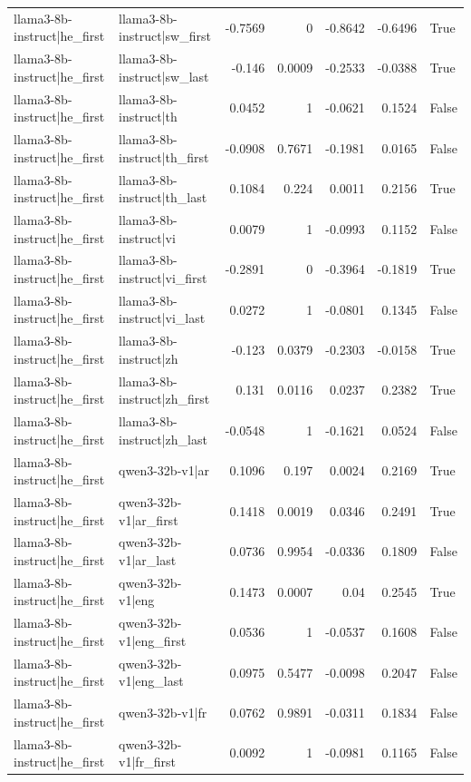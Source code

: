 \begin{table}
\begin{tabular}{l l r r r r l}
llama3-8b-instruct|he_first & llama3-8b-instruct|sw_first & -0.7569 & 0 & -0.8642 & -0.6496 & True \\
llama3-8b-instruct|he_first & llama3-8b-instruct|sw_last & -0.146 & 0.0009 & -0.2533 & -0.0388 & True \\
llama3-8b-instruct|he_first & llama3-8b-instruct|th & 0.0452 & 1 & -0.0621 & 0.1524 & False \\
llama3-8b-instruct|he_first & llama3-8b-instruct|th_first & -0.0908 & 0.7671 & -0.1981 & 0.0165 & False \\
llama3-8b-instruct|he_first & llama3-8b-instruct|th_last & 0.1084 & 0.224 & 0.0011 & 0.2156 & True \\
llama3-8b-instruct|he_first & llama3-8b-instruct|vi & 0.0079 & 1 & -0.0993 & 0.1152 & False \\
llama3-8b-instruct|he_first & llama3-8b-instruct|vi_first & -0.2891 & 0 & -0.3964 & -0.1819 & True \\
llama3-8b-instruct|he_first & llama3-8b-instruct|vi_last & 0.0272 & 1 & -0.0801 & 0.1345 & False \\
llama3-8b-instruct|he_first & llama3-8b-instruct|zh & -0.123 & 0.0379 & -0.2303 & -0.0158 & True \\
llama3-8b-instruct|he_first & llama3-8b-instruct|zh_first & 0.131 & 0.0116 & 0.0237 & 0.2382 & True \\
llama3-8b-instruct|he_first & llama3-8b-instruct|zh_last & -0.0548 & 1 & -0.1621 & 0.0524 & False \\
llama3-8b-instruct|he_first & qwen3-32b-v1|ar & 0.1096 & 0.197 & 0.0024 & 0.2169 & True \\
llama3-8b-instruct|he_first & qwen3-32b-v1|ar_first & 0.1418 & 0.0019 & 0.0346 & 0.2491 & True \\
llama3-8b-instruct|he_first & qwen3-32b-v1|ar_last & 0.0736 & 0.9954 & -0.0336 & 0.1809 & False \\
llama3-8b-instruct|he_first & qwen3-32b-v1|eng & 0.1473 & 0.0007 & 0.04 & 0.2545 & True \\
llama3-8b-instruct|he_first & qwen3-32b-v1|eng_first & 0.0536 & 1 & -0.0537 & 0.1608 & False \\
llama3-8b-instruct|he_first & qwen3-32b-v1|eng_last & 0.0975 & 0.5477 & -0.0098 & 0.2047 & False \\
llama3-8b-instruct|he_first & qwen3-32b-v1|fr & 0.0762 & 0.9891 & -0.0311 & 0.1834 & False \\
llama3-8b-instruct|he_first & qwen3-32b-v1|fr_first & 0.0092 & 1 & -0.0981 & 0.1165 & False \\

\end{tabular}
\end{table}
